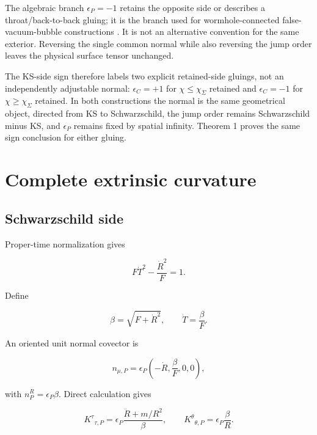 \documentclass[pdflatex,sn-mathphys-num]{sn-jnl}
\begin{document}
The algebraic branch \(\epsilon_P=-1\) retains the opposite side or describes a throat/back-to-back gluing; it is the branch used for wormhole-connected false-vacuum-bubble constructions \cite{ref4,ref5}. It is not an alternative convention for the same exterior. Reversing the single common normal while also reversing the jump order leaves the physical surface tensor unchanged.


The KS-side sign therefore labels two explicit retained-side gluings, not an independently adjustable normal: \(\epsilon_C=+1\) for \(\chi\le\chi_\Sigma\) retained and \(\epsilon_C=-1\) for \(\chi\ge\chi_\Sigma\) retained. In both constructions the normal is the same geometrical object, directed from KS to Schwarzschild, the jump order remains Schwarzschild minus KS, and \(\epsilon_P\) remains fixed by spatial infinity. Theorem 1 proves the same sign conclusion for either gluing.


\section{Complete extrinsic curvature}

\subsection{Schwarzschild side}

Proper-time normalization gives


\begin{equation}
F\dot T^2-\frac{\dot R^2}{F}=1.
\tag{10}
\end{equation}

Define


\begin{equation}
\beta=\sqrt{F+\dot R^2},
\qquad
\dot T=\frac{\beta}{F}.
\tag{11}
\end{equation}

An oriented unit normal covector is


\begin{equation}
n_{\mu,P}
=\epsilon_P\left(-\dot R,\frac{\beta}{F},0,0\right),
\tag{12}
\end{equation}

with \(n_P^R=\epsilon_P\beta\). Direct calculation gives


\begin{equation}
\boxed{
K^\tau{}_{\tau,P}
=\epsilon_P\frac{\ddot R+m/R^2}{\beta},
\qquad
K^\theta{}_{\theta,P}
=\epsilon_P\frac{\beta}{R}.
}
\tag{13}
\end{equation}
\end{document}
